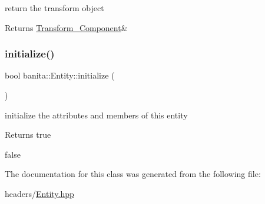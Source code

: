 return the transform object 

\begin{DoxyReturn}{Returns}
\mbox{\hyperlink{classbanita_1_1_transform___component}{Transform\+\_\+\+Component}}\& 
\end{DoxyReturn}
\mbox{\label{classbanita_1_1_entity_a1e070b4458ecebabbec87e90a3235f8e}} 
\subsubsection{\texorpdfstring{initialize()}{initialize()}}
{\footnotesize\ttfamily bool banita\+::\+Entity\+::initialize (\begin{DoxyParamCaption}{ }\end{DoxyParamCaption})}



initialize the attributes and members of this entity 

\begin{DoxyReturn}{Returns}
true 

false 
\end{DoxyReturn}


The documentation for this class was generated from the following file\+:\begin{DoxyCompactItemize}
\item 
headers/\mbox{\hyperlink{_entity_8hpp}{Entity.\+hpp}}\end{DoxyCompactItemize}
